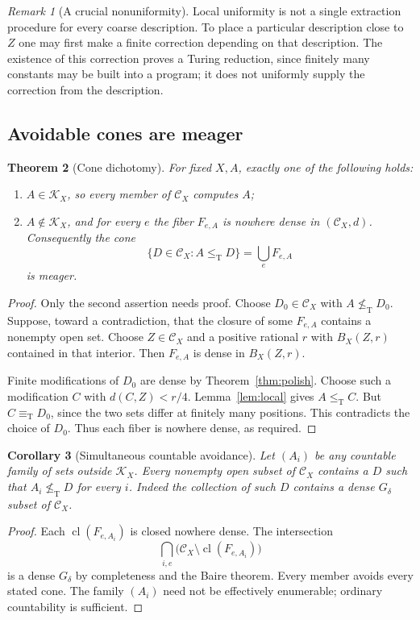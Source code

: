 \documentclass[11pt,a4paper]{article}
\newcommand{\leT}{\leq_{\mathrm T}}
\newcommand{\nleT}{\nleq_{\mathrm T}}
\newcommand{\eqT}{\equiv_{\mathrm T}}
\newcommand{\CD}[1]{\mathcal C_{#1}}
\newcommand{\Core}[1]{\mathcal K_{#1}}
\newcommand{\cl}{\operatorname{cl}}
\newtheorem{theorem}{Theorem}[section]
\newtheorem{corollary}[theorem]{Corollary}
\theoremstyle{definition}\newtheorem{definition}[theorem]{Definition}
\theoremstyle{remark}\newtheorem{remark}[theorem]{Remark}
\begin{document}
\begin{remark}[A crucial nonuniformity]
Local uniformity is not a single extraction procedure for every coarse description. To place a particular description close to $Z$ one may first make a finite correction depending on that description. The existence of this correction proves a Turing reduction, since finitely many constants may be built into a program; it does not uniformly supply the correction from the description.
\end{remark}

\subsection{Avoidable cones are meager}
\begin{theorem}[Cone dichotomy]\label{thm:cone}
For fixed $X,A$, exactly one of the following holds:
\begin{enumerate}
\item $A\in\Core X$, so every member of $\CD X$ computes $A$;
\item $A\notin\Core X$, and for every $e$ the fiber $F_{e,A}$ is nowhere dense in $(\CD X,d)$. Consequently the cone
\[
             \{D\in\CD X:A\leT D\}=\bigcup_e F_{e,A}
\]
is meager.
\end{enumerate}
\end{theorem}
\begin{proof}
Only the second assertion needs proof. Choose $D_0\in\CD X$ with $A\nleT D_0$. Suppose, toward a contradiction, that the closure of some $F_{e,A}$ contains a nonempty open set. Choose $Z\in\CD X$ and a positive rational $r$ with $B_X(Z,r)$ contained in that interior. Then $F_{e,A}$ is dense in $B_X(Z,r)$.

Finite modifications of $D_0$ are dense by Theorem~\ref{thm:polish}. Choose such a modification $C$ with $d(C,Z)<r/4$. Lemma~\ref{lem:local} gives $A\leT C$. But $C\eqT D_0$, since the two sets differ at finitely many positions. This contradicts the choice of $D_0$. Thus each fiber is nowhere dense, as required.
\end{proof}

\begin{corollary}[Simultaneous countable avoidance]\label{cor:avoidance}
Let $(A_i)$ be any countable family of sets outside $\Core X$. Every nonempty open subset of $\CD X$ contains a $D$ such that $A_i\nleT D$ for every $i$. Indeed the collection of such $D$ contains a dense $G_\delta$ subset of $\CD X$.
\end{corollary}
\begin{proof}
Each $\cl(F_{e,A_i})$ is closed nowhere dense. The intersection
\[
 \bigcap_{i,e}\bigl(\CD X\setminus\cl(F_{e,A_i})\bigr)
\]
is a dense $G_\delta$ by completeness and the Baire theorem. Every member avoids every stated cone. The family $(A_i)$ need not be effectively enumerable; ordinary countability is sufficient.
\end{proof}
\end{document}
